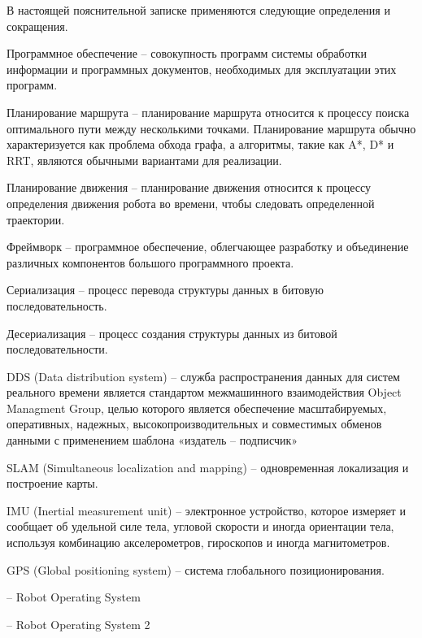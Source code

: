 В настоящей пояснительной записке применяются следующие определения и
сокращения.

Программное обеспечение -- совокупность программ системы обработки
информации и программных документов, необходимых для эксплуатации этих
программ.

Планирование маршрута -- планирование маршрута относится к процессу
поиска оптимального пути между несколькими точками. Планирование маршрута обычно
характеризуется как проблема обхода графа, а алгоритмы, такие как A*, D* и RRT,
являются обычными вариантами для реализации.

Планирование движения -- планирование движения относится к процессу
определения движения робота во времени, чтобы следовать определенной
траектории.

Фреймворк -- программное обеспечение, облегчающее разработку и
объединение различных компонентов большого программного проекта.

Сериализация -- процесс перевода структуры данных в битовую последовательность.

Десериализация -- процесс создания структуры данных из битовой последовательности.

DDS (Data distribution system) -- служба распространения данных для систем
реального времени является стандартом межмашинного взаимодействия Object
Managment Group, целью которого является обеспечение масштабируемых,
оперативных, надежных, высокопроизводительных и совместимых обменов данными с
применением шаблона «издатель -- подписчик»

SLAM (Simultaneous localization and mapping) -- одновременная локализация и
построение карты.

IMU (Inertial measurement unit) -- электронное устройство, которое измеряет и
сообщает об удельной силе тела, угловой скорости и иногда ориентации тела,
используя комбинацию акселерометров, гироскопов и иногда магнитометров. 

GPS (Global positioning system) -- система глобального позиционирования.

\ros{} -- Robot Operating System

\rosTwo{} -- Robot Operating System 2
